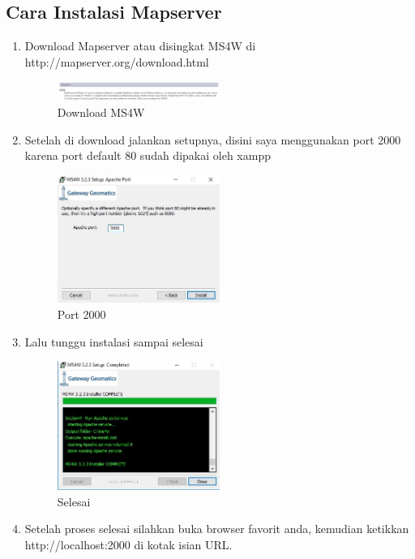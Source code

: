 \subsection{Cara Instalasi Mapserver}
\begin{enumerate}
\item
Download Mapserver atau disingkat MS4W di http://mapserver.org/download.html
\begin{figure}[ht]
	    \centerline{\includegraphics[width=0.50\textwidth]{figures/gambar1.JPG}}
	    \caption{Download MS4W}
		\label{gambar1}
		\end{figure}
\item
Setelah di download jalankan setupnya, disini saya menggunakan port 2000 karena port default 80 sudah dipakai oleh xampp
\begin{figure}[ht]
	    \centerline{\includegraphics[width=0.50\textwidth]{figures/gambar2.JPG}}
	    \caption{Port 2000}
		\label{gambar2}
		\end{figure}
\item
Lalu tunggu instalasi sampai selesai
\begin{figure}[ht]
	    \centerline{\includegraphics[width=0.50\textwidth]{figures/gambar3.JPG}}
	    \caption{Selesai}
		\label{gambar3}
		\end{figure}
\item
Setelah proses selesai silahkan buka browser favorit anda, kemudian ketikkan http://localhost:2000 di kotak isian URL.

\end{enumerate}

